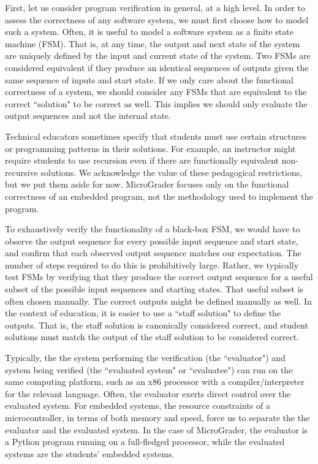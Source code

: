\documentclass[12pt]{article}
\begin{document}
First, let us consider program verification in general, at a high level. In order to assess the correctness of any software system, we must first choose how to model such a system.  Often, it is useful to model a software system as a finite state machine (FSM).  That is, at any time, the output and next state of the system are uniquely defined by the input and current state of the system.  Two FSMs are considered equivalent if they produce an identical sequences of outputs given the same sequence of inputs and start state.  If we only care about the functional correctness of a system, we should consider any FSMs that are equivalent to the correct ``solution" to be correct as well.  This implies we should only evaluate the output sequences and not the internal state.

Technical educators sometimes specify that students must use certain structures or programming patterns in their solutions.  For example, an instructor might require students to use recursion even if there are functionally equivalent non-recursive solutions.  We acknowledge the value of these pedagogical restrictions, but we put them aside for now.  MicroGrader focuses only on the functional correctness of an embedded program, not the methodology used to implement the program.

To exhaustively verify the functionality of a black-box FSM, we would have to observe the output sequence for every possible input sequence and start state, and confirm that each observed output sequence matches our expectation. The number of steps required to do this is prohibitively large.  Rather, we typically test FSMs by verifying that they produce the correct output sequence for a useful subset of the possible input sequences and starting states.  That useful subset is often chosen manually.  The correct outputs might be defined manually as well.  In the context of education, it is easier to use a ``staff solution" to define the outputs.  That is, the staff solution is canonically considered correct, and student solutions must match the output of the staff solution to be considered correct.
   
Typically, the the system performing the verification (the ``evaluator") and system being verified (the ``evaluated system" or ``evaluatee") can run on the same computing platform, such as an x86 processor with a compiler/interpreter for the relevant language.  Often, the evaluator exerts direct control over the evaluated system.  For embedded systems, the resource constraints of a microcontroller, in terms of both memory and speed, force us to separate the the evaluator and the evaluated system.  In the case of MicroGrader, the evaluator is a Python program running on a full-fledged processor, while the evaluated systems are the students' embedded systems.
\end{document}
